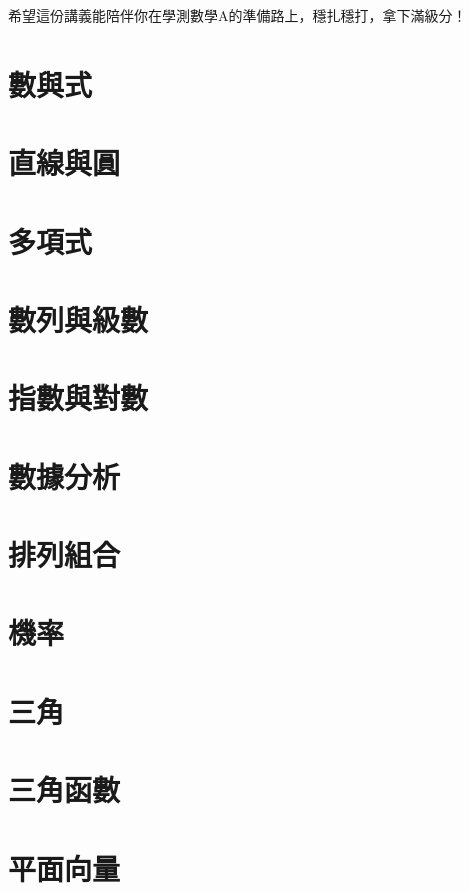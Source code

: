 \documentclass[a4paper,12pt]{report}
\begin{document}
希望這份講義能陪伴你在學測數學A的準備路上，穩扎穩打，拿下滿級分！

\chapter{數與式}


\chapter{直線與圓}


\chapter{多項式}


\chapter{數列與級數}


\chapter{指數與對數}


\chapter{數據分析}


\chapter{排列組合}


\chapter{機率}


\chapter{三角}


\chapter{三角函數}



\chapter{平面向量}

\end{document}
